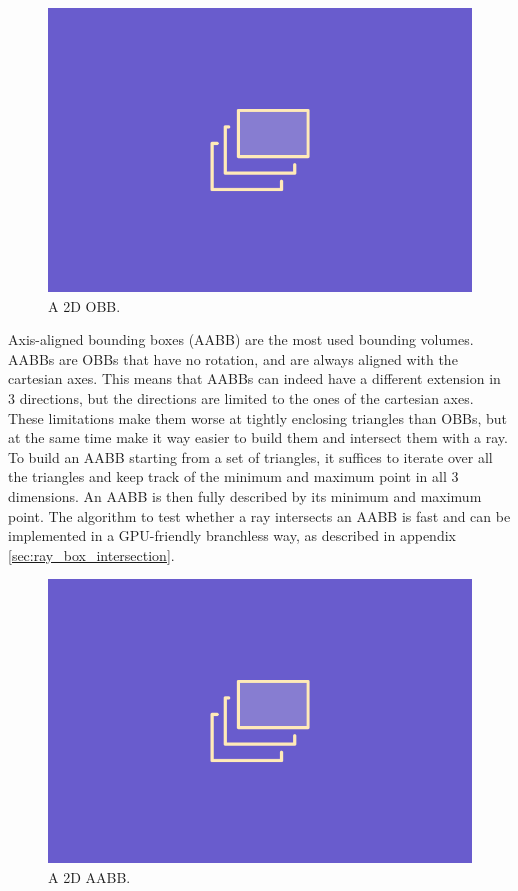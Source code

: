\documentclass{PoliMi_MasterThesis}
\begin{document}
\begin{figure}[H]
    \centering
    \includegraphics[width=\textwidth*\real{0.4}]{Images/TODO.png}
    \caption{A 2D OBB.}
    \label{fig:obb}
\end{figure}

Axis-aligned bounding boxes (AABB) are the most used bounding volumes. AABBs are OBBs that have no rotation, and are always aligned with the cartesian axes. This means that AABBs can indeed have a different extension in 3 directions, but the directions are limited to the ones of the cartesian axes. These limitations make them worse at tightly enclosing triangles than OBBs, but at the same time make it way easier to build them and intersect them with a ray. To build an AABB starting from a set of triangles, it suffices to iterate over all the triangles and keep track of the minimum and maximum point in all 3 dimensions. An AABB is then fully described by its minimum and maximum point. The algorithm to test whether a ray intersects an AABB is fast and can be implemented in a GPU-friendly branchless way, as described in appendix \ref{sec:ray_box_intersection}.

\begin{figure}[H]
    \centering
    \includegraphics[width=\textwidth*\real{0.4}]{Images/TODO.png}
    \caption{A 2D AABB.}
    \label{fig:aabb}
\end{figure}
\end{document}
